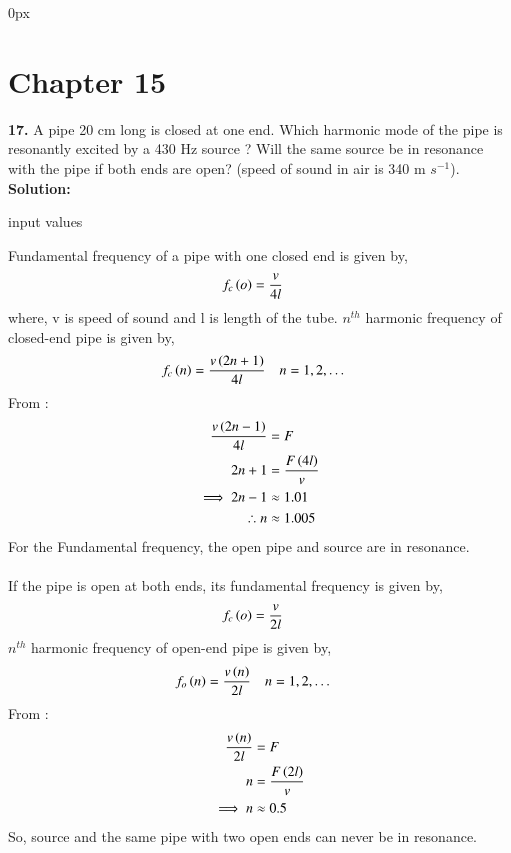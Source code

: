 \documentclass[journal,12pt,twocolumn]{IEEEtran}
\begin{document}
	\parindent 0px
	
	
	\vspace{3cm}
	
	\title{}
	\author{EE23BTECH11209 - K S Ballvardhan$^{*}$
	}
	\maketitle
	\newpage
	\bigskip
	
	
	
	\section*{Chapter 15}
	
	\noindent \textbf{17.} A pipe 20 cm long is closed at one end. Which harmonic mode of the pipe is resonantly excited by a 430 Hz source ? Will the same source be in resonance with
	the pipe if both ends are open? (speed of sound in air is 340 m $s^{-1}$).\\
	
	\textbf {Solution: }
	
	\begin{table}[ht] 
		\centering
		
		\caption{input values}
		\label{tab: Table analog1}
	\end{table}
	Fundamental frequency of a pipe with one closed end is given by,
	\begin{align}
		f_c\left(o\right) &= \frac{v}{4l}
	\end{align}
	where, v is speed of sound and l is length of the tube.
	$ n^{th}$ harmonic frequency of closed-end pipe is given by,
	\begin{align}
		f_c\left(n\right) &= \frac{v\left(2n+1\right)}{4l}\quad n= 1,2,\dots
	\end{align}
	From :
	\begin{align}
		\frac{v\left(2n-1\right)}{4l} &= F\\
		2n+1 &= \frac{F\left(4l\right)}{v}\\
		\implies 2n-1 &\approx 1.01\\
		\therefore n&\approx 1.005
	\end{align}
	For the Fundamental frequency, the open pipe and source are in resonance.\\\\
	If the pipe is open at both ends, its fundamental frequency is given by,
	\begin{align}
		f_c\left(o\right) &= \frac{v}{2l}
	\end{align}
	$ n^{th}$ harmonic frequency of open-end pipe is given by,
	\begin{align}
		f_o\left(n\right) &= \frac{v\left(n\right)}{2l}\quad n= 1,2,\dots
	\end{align}
	From :
	\begin{align}
		\frac{v\left(n\right)}{2l} &= F\\
		n &= \frac{F\left(2l\right)}{v}\\
		\implies n &\approx 0.5
	\end{align}
	So, source and the same pipe with two open ends can never be in resonance.
\end{document}

